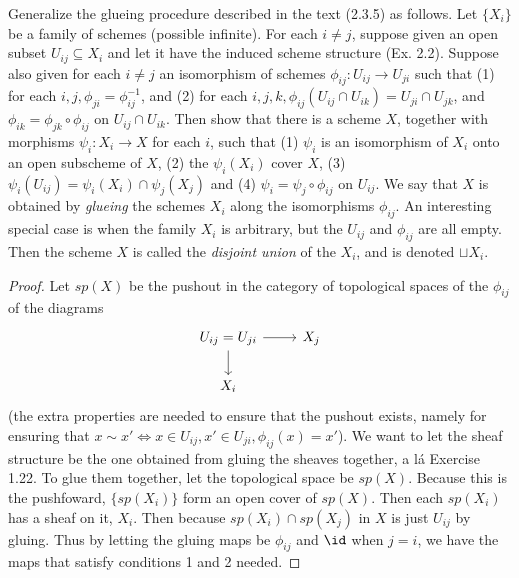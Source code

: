\begin{exercise}
	Generalize the glueing procedure described in the text (2.3.5) as follows. Let $\{X_i\}$ be a family of schemes (possible infinite). For each $i \ne j$, suppose given an open subset $U_{ij} \subseteq X_i$ and let it have the induced scheme structure (Ex. 2.2). Suppose also given for each $i \ne j$ an isomorphism of schemes $\phi_{ij}: U_{ij} \to U_{ji}$ such that (1) for each $i,j, \phi_{ji} = \phi_{ij}^{-1}$, and (2) for each $i,j,k, \phi_{ij}(U_{ij}\cap U_{ik}) = U_{ji}\cap U_{jk} $, and $\phi_{ik} = \phi_{jk}\circ \phi_{ij}$ on $U_{ij} \cap U_{ik}$. Then show that there is a scheme $X$, together with morphisms $\psi_i:X_i \to X$ for each $i$, such that (1) $\psi_{i}$ is an isomorphism of $X_i$ onto an open subscheme of $X$, (2) the $\psi_i(X_i)$ cover $X$, (3) $\psi_i(U_{ij}) = \psi_i(X_i) \cap \psi_j(X_j)$ and (4) $\psi_i = \psi_j \circ \phi_{ij}$ on $U_{ij}$. We say that $X$ is obtained by \textit{glueing} the schemes $X_i$ along the isomorphisms $\phi_{ij}$. An interesting special case is when the family $X_i$ is arbitrary, but the $U_{ij}$ and $\phi_{ij}$ are all empty. Then the scheme $X$ is called the \textit{disjoint union} of the $X_i $, and is denoted $\sqcup X_i $.
\end{exercise}
\begin{proof}
	Let $sp(X) $ be the pushout in the category of topological spaces of the $\phi_{ij}$ of the diagrams
	\[
	\begin{tikzcd}
	U_{ij} = U_{ji} & X_j\\
	X_i &
	\arrow[from=1-1,to=1-2]
	\arrow[from=1-1,to=2-1]
	\end{tikzcd}
	\]
	(the extra properties are needed to ensure that the pushout exists, namely for ensuring that $x\sim x' \iff x \in U_{ij}, x' \in U_{ji}, \phi_{ij}(x) = x' $).
	We want to let the sheaf structure be the one obtained from gluing the sheaves together, a l\'a Exercise 1.22.
	To glue them together, let the topological space be $sp(X) $.
	Because this is the pushfoward, $\{sp(X_i)\} $ form an open cover of $sp(X) $.
	Then each $sp(X_i) $ has a sheaf on it, $X_i $.
	Then because $sp(X_i) \cap sp(X_j) $ in $X $ is just $U_{ij} $ by gluing.
	Thus by letting the gluing maps be $\phi_{ij} $ and $\id $ when $j=i $, we have the maps that satisfy conditions 1 and 2 needed.
\end{proof}

